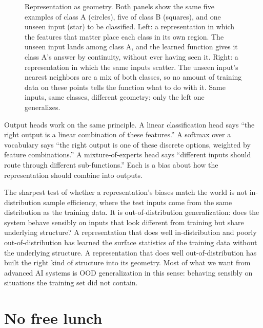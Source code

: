 \begin{figure}[h]
\caption{Representation as geometry. Both panels show the same five examples of class A (circles), five of class B (squares), and one unseen input (star) to be classified. Left: a representation in which the features that matter place each class in its own region. The unseen input lands among class A, and the learned function gives it class A's answer by continuity, without ever having seen it. Right: a representation in which the same inputs scatter. The unseen input's nearest neighbors are a mix of both classes, so no amount of training data on these points tells the function what to do with it. Same inputs, same classes, different geometry; only the left one generalizes.}
\label{fig:representation-geometry}
\end{figure}

Output heads work on the same principle. A linear classification head says ``the right output is a linear combination of these features.'' A softmax over a vocabulary says ``the right output is one of these discrete options, weighted by feature combinations.'' A mixture-of-experts head says ``different inputs should route through different sub-functions.'' Each is a bias about how the representation should combine into outputs.

The sharpest test of whether a representation's biases match the world is not in-distribution sample efficiency, where the test inputs come from the same distribution as the training data. It is out-of-distribution generalization: does the system behave sensibly on inputs that look different from training but share underlying structure? A representation that does well in-distribution and poorly out-of-distribution has learned the surface statistics of the training data without the underlying structure. A representation that does well out-of-distribution has built the right kind of structure into its geometry. Most of what we want from advanced AI systems is OOD generalization in this sense: behaving sensibly on situations the training set did not contain.

\section*{No free lunch}

